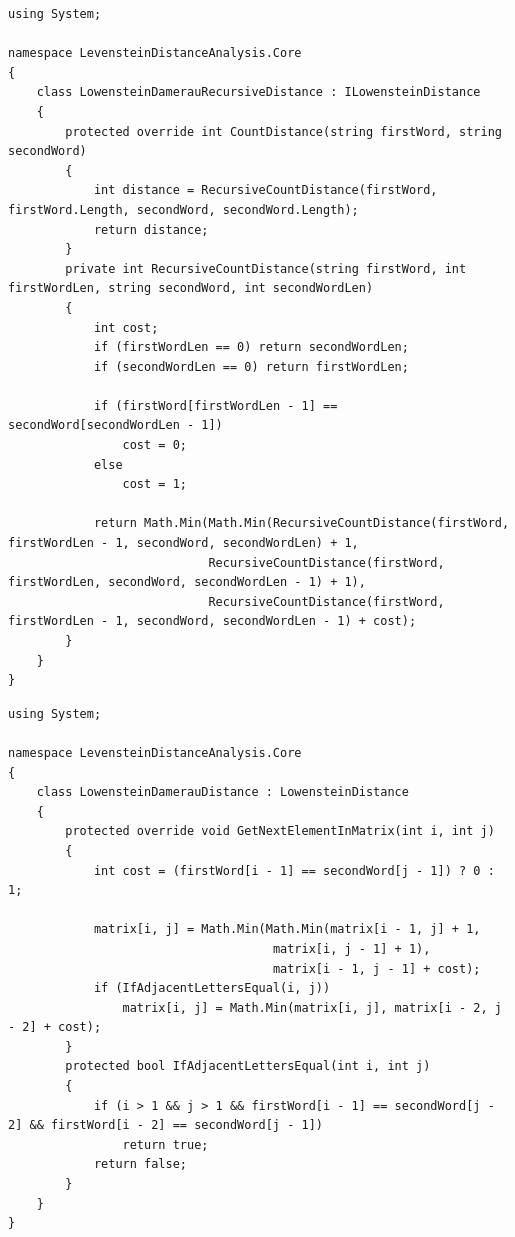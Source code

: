 \documentclass[12pt]{report}
\begin{document}
\begin{lstlisting}[label=some-code,caption=Класс нахождения расстояния Дамерау-Левенштейна рекурсивно]
using System;

namespace LevensteinDistanceAnalysis.Core
{
    class LowensteinDamerauRecursiveDistance : ILowensteinDistance
    {
        protected override int CountDistance(string firstWord, string secondWord)
        {
            int distance = RecursiveCountDistance(firstWord, firstWord.Length, secondWord, secondWord.Length);
            return distance;
        }
        private int RecursiveCountDistance(string firstWord, int firstWordLen, string secondWord, int secondWordLen)
        {
            int cost;
            if (firstWordLen == 0) return secondWordLen;
            if (secondWordLen == 0) return firstWordLen;
            
            if (firstWord[firstWordLen - 1] == secondWord[secondWordLen - 1])
                cost = 0;
            else
                cost = 1;
            
            return Math.Min(Math.Min(RecursiveCountDistance(firstWord, firstWordLen - 1, secondWord, secondWordLen) + 1,
                            RecursiveCountDistance(firstWord, firstWordLen, secondWord, secondWordLen - 1) + 1),
                            RecursiveCountDistance(firstWord, firstWordLen - 1, secondWord, secondWordLen - 1) + cost);
        }
    }
}

\end{lstlisting}

\begin{lstlisting}[label=some-code,caption=Класс нахождения расстояния Дамерау-Левенштейна матрично]
using System;

namespace LevensteinDistanceAnalysis.Core
{
    class LowensteinDamerauDistance : LowensteinDistance
    {
        protected override void GetNextElementInMatrix(int i, int j)
        {
            int cost = (firstWord[i - 1] == secondWord[j - 1]) ? 0 : 1;

            matrix[i, j] = Math.Min(Math.Min(matrix[i - 1, j] + 1,
                                     matrix[i, j - 1] + 1),
                                     matrix[i - 1, j - 1] + cost);
            if (IfAdjacentLettersEqual(i, j))
                matrix[i, j] = Math.Min(matrix[i, j], matrix[i - 2, j - 2] + cost);
        }
        protected bool IfAdjacentLettersEqual(int i, int j)
        {
            if (i > 1 && j > 1 && firstWord[i - 1] == secondWord[j - 2] && firstWord[i - 2] == secondWord[j - 1])
                return true;
            return false;
        }
    }
}

\end{lstlisting}
\end{document}
